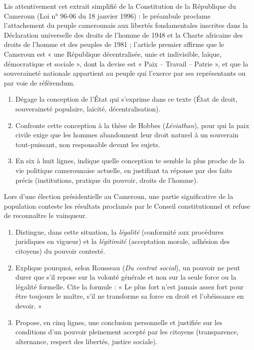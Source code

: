 \documentclass[11pt]{article}
\newcommand{\cle}[1]{{\popxbold\color{popdark}#1}}
\begin{document}
\begin{exercice}
Lis attentivement cet extrait simplifié de la Constitution de la République du Cameroun (Loi n° 96-06 du 18 janvier 1996) : le préambule proclame l'attachement du peuple camerounais aux libertés fondamentales inscrites dans la Déclaration universelle des droits de l'homme de 1948 et la Charte africaine des droits de l'homme et des peuples de 1981 ; l'article premier affirme que le Cameroun est « une République décentralisée, unie et indivisible, laïque, démocratique et sociale », dont la devise est « Paix -- Travail -- Patrie », et que la souveraineté nationale appartient au peuple qui l'exerce par ses représentants ou par voie de référendum.
\begin{enumerate}
\item Dégage la conception de l'État qui s'exprime dans ce texte (État de droit, souveraineté populaire, laïcité, décentralisation).
\item Confronte cette conception à la thèse de Hobbes (\emph{Léviathan}), pour qui la paix civile exige que les hommes abandonnent leur droit naturel à un souverain tout-puissant, non responsable devant les sujets.
\item En six à huit lignes, indique quelle conception te semble la plus proche de la vie politique camerounaise actuelle, en justifiant ta réponse par des faits précis (institutions, pratique du pouvoir, droits de l'homme).
\end{enumerate}
\end{exercice}

\begin{exercice}
Lors d'une élection présidentielle au Cameroun, une partie significative de la population conteste les résultats proclamés par le Conseil constitutionnel et refuse de reconnaître le vainqueur.
\begin{enumerate}
\item Distingue, dans cette situation, la \emph{légalité} (conformité aux procédures juridiques en vigueur) et la \emph{légitimité} (acceptation morale, adhésion des citoyens) du pouvoir contesté.
\item Explique pourquoi, selon Rousseau (\emph{Du contrat social}), un pouvoir ne peut durer que s'il repose sur la \cle{volonté générale} et non sur la seule force ou la légalité formelle. Cite la formule : « Le plus fort n'est jamais assez fort pour être toujours le maître, s'il ne transforme sa force en droit et l'obéissance en devoir. »
\item Propose, en cinq lignes, une conclusion personnelle et justifiée sur les conditions d'un pouvoir pleinement accepté par les citoyens (transparence, alternance, respect des libertés, justice sociale).
\end{enumerate}
\end{exercice}
\end{document}
